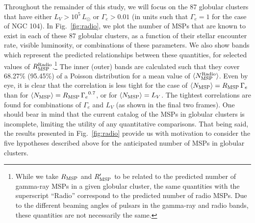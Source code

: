 Throughout the remainder of this study, we will focus on the 87 globular clusters that have either $L_V > 10^5 \, L_{\odot}$ or $\Gamma_e > 0.01$ (in units such that $\Gamma_e =1$ for the case of NGC 104). In Fig.~\ref{fig:radio}, we plot the number of MSPs that are known to exist in each of these 87 globular clusters, as a function of their stellar encounter rate, visible luminosity, or combinations of these parameters. We also show bands which represent the predicted relationships between these quantities, for selected values of $R_{\rm MSP}^{\rm Radio}$.\footnote{While we take $R_{\rm MSP}$ and $R'_{\rm MSP}$ to be related to the predicted number of gamma-ray MSPs in a given globular cluster, the same quantities with the superscript ``Radio'' correspond to the predicted number of radio MSPs. Due to the different beaming angles of pulsars in the gamma-ray and radio bands, these quantities are not necessarily the same.} 
The inner (outer) bands are calculated such that they cover 68.27\% (95.45\%) of a Poisson distribution for a mean value of $\langle N_{\rm MSP}^{\rm Radio} \rangle$. Even by eye, it is clear that the correlation is less tight for the case of $\langle N_{\rm MSP} \rangle = R_{\rm MSP}\,{\Gamma_e}$ than for $\langle N_{\rm MSP} \rangle = R_{\rm MSP}\,{\Gamma_e}^{0.7}$, or for $\langle N_{\rm MSP} \rangle = L_V$. The tightest correlations are found for combinations of $\Gamma_e$ and $L_V$ (as shown in the final two frames). One should bear in mind that the current catalog of the MSPs in globular clusters is incomplete, limiting the utility of any quantitative comparisons. That being said, the results presented in Fig.~\ref{fig:radio} provide us with motivation to consider the five hypotheses described above for the anticipated number of MSPs in globular clusters.

